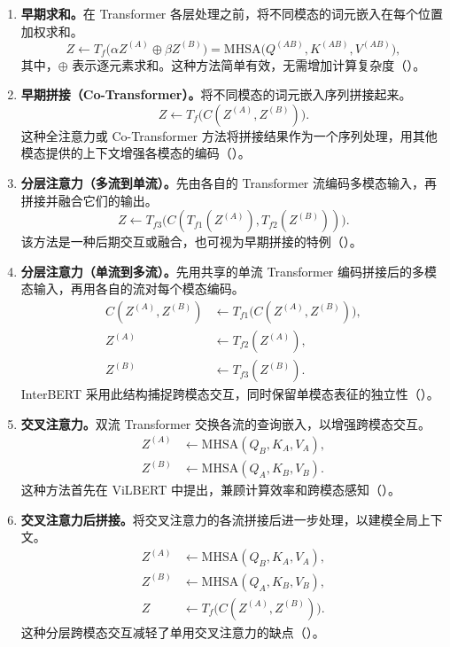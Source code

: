 \begin{enumerate}
\item \textbf{早期求和。}在 Transformer 各层处理之前，将不同模态的词元嵌入在每个位置加权求和。
\[
Z\leftarrow T_f\bigl(\alpha Z^{(A)}\oplus\beta Z^{(B)}\bigr)
=\mathrm{MHSA}\bigl(Q^{(AB)},K^{(AB)},V^{(AB)}\bigr),
\]
其中，$\oplus$ 表示逐元素求和。这种方法简单有效，无需增加计算复杂度（）。
\item \textbf{早期拼接（Co-Transformer）。}将不同模态的词元嵌入序列拼接起来。
\[
Z\leftarrow T_f\bigl(C(Z^{(A)},Z^{(B)})\bigr).
\]
这种全注意力或 Co-Transformer 方法将拼接结果作为一个序列处理，用其他模态提供的上下文增强各模态的编码（）。
\item \textbf{分层注意力（多流到单流）。}先由各自的 Transformer 流编码多模态输入，再拼接并融合它们的输出。
\[
Z\leftarrow T_{f3}\bigl(C(T_{f1}(Z^{(A)}),T_{f2}(Z^{(B)}))\bigr).
\]
该方法是一种后期交互或融合，也可视为早期拼接的特例（）。
\item \textbf{分层注意力（单流到多流）。}先用共享的单流 Transformer 编码拼接后的多模态输入，再用各自的流对每个模态编码。
\[
\begin{aligned}
C(Z^{(A)},Z^{(B)})&\leftarrow T_{f1}\bigl(C(Z^{(A)},Z^{(B)})\bigr),\\
Z^{(A)}&\leftarrow T_{f2}(Z^{(A)}),\\
Z^{(B)}&\leftarrow T_{f3}(Z^{(B)}).
\end{aligned}
\]
InterBERT 采用此结构捕捉跨模态交互，同时保留单模态表征的独立性（）。
\item \textbf{交叉注意力。}双流 Transformer 交换各流的查询嵌入，以增强跨模态交互。
\[
\begin{aligned}
Z^{(A)}&\leftarrow\mathrm{MHSA}(Q_B,K_A,V_A),\\
Z^{(B)}&\leftarrow\mathrm{MHSA}(Q_A,K_B,V_B).
\end{aligned}
\]
这种方法首先在 ViLBERT 中提出，兼顾计算效率和跨模态感知（）。
\item \textbf{交叉注意力后拼接。}将交叉注意力的各流拼接后进一步处理，以建模全局上下文。
\[
\begin{aligned}
Z^{(A)}&\leftarrow\mathrm{MHSA}(Q_B,K_A,V_A),\\
Z^{(B)}&\leftarrow\mathrm{MHSA}(Q_A,K_B,V_B),\\
Z&\leftarrow T_f\bigl(C(Z^{(A)},Z^{(B)})\bigr).
\end{aligned}
\]
这种分层跨模态交互减轻了单用交叉注意力的缺点（）。
\end{enumerate}







